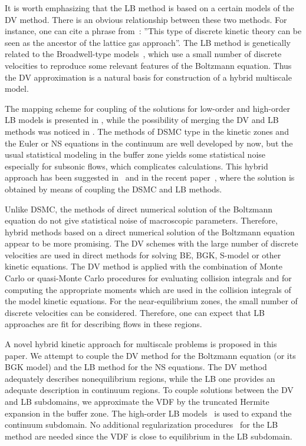 \documentclass[]{elsarticle} %
\begin{document}
It is worth emphasizing that the LB method is based on a certain models of the DV method.
There is an obvious relationship between these two methods. For instance, one can cite a phrase from~\cite{Rivet2001}:
''This type of discrete kinetic theory can be seen as the ancestor of the lattice gas approach''.
The LB method is genetically related to the Broadwell-type models~\cite{Broadwell1964shock, Gatignol1975},
which use a small number of discrete velocities to reproduce some relevant features of the Boltzmann equation.
Thus the DV approximation is a natural basis for construction of a hybrid multiscale model.

The mapping scheme for coupling of the solutions for low-order and high-order LB models is presented in \cite{Meng2011},
while the possibility of merging the DV and LB methods was noticed in \cite{Succi2016}.
The methods of DSMC type in the kinetic zones and the Euler or NS equations in the continuum are well developed by now,
but the usual statistical modeling in the buffer zone yields some statistical noise especially for subsonic flows, which complicates calculations.
This hybrid approach has been suggested in~\cite{Staso2016short, Staso2016long} and in the recent paper~\cite{Staso2018},
where the solution is obtained by means of coupling the DSMC and LB methods.

Unlike DSMC, the methods of direct numerical solution of the Boltzmann equation do not give statistical noise of macroscopic parameters.
Therefore, hybrid methods based on a direct numerical solution of the Boltzmann equation appear to be more promising.
The DV schemes with the large number of discrete velocities are used in direct methods for solving BE, BGK, S-model or other kinetic equations.
The DV method is applied with the combination of Monte Carlo or quasi-Monte Carlo procedures for evaluating collision integrals
and for computing the appropriate moments which are used in the collision integrals of the model kinetic equations.
For the near-equilibrium zones, the small number of discrete velocities can be considered.
Therefore, one can expect that LB approaches are fit for describing flows in these regions.

A novel hybrid kinetic approach for multiscale problems is proposed in this paper.
We attempt to couple the DV method for the Boltzmann equation (or its BGK model) and the LB method for the NS equations.
The DV method adequately describes nonequilibrium regions, while the LB one provides an adequate description in continuum regions.
To couple solutions between the DV and LB subdomains, we approximate the VDF by the truncated Hermite expansion in the buffer zone.
The high-order LB models~\cite{Shan2006, Feuchter2016} is used to expand the continuum subdomain.
No additional regularization procedures~\cite{Latt2006, Mont2015} for the LB method are needed
since the VDF is close to equilibrium in the LB subdomain.
\end{document}
